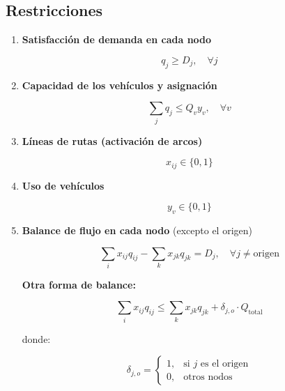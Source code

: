 \documentclass[11pt, a4paper]{article}
\begin{document}
\subsection{Restricciones}  
\begin{enumerate}[label=\roman*., leftmargin=*]  
    \item \textbf{Satisfacción de demanda en cada nodo}  
    
    \begin{equation}
    q_{j} \geq D_{j}, \quad \forall j  
    \end{equation}
    
    \item \textbf{Capacidad de los vehículos y asignación}  
    
    \begin{equation}
    \sum_{j} q_{j} \leq Q_{v} y_{v}, \quad \forall v  
    \end{equation}
    
    \item \textbf{Líneas de rutas (activación de arcos)}  
    
    \begin{equation}
    x_{ij} \in \{0,1\}  
    \end{equation}
    
    \item \textbf{Uso de vehículos}  
    
    \begin{equation}
    y_{v} \in \{0,1\}  
    \end{equation}
    
    \item \textbf{Balance de flujo en cada nodo} (excepto el origen)  
    
    \begin{equation}
    \sum_{i} x_{ij} q_{ij} - \sum_{k} x_{jk} q_{jk} = D_{j}, \quad \forall j \neq \text{origen}  
    \end{equation}
    
    \textbf{Otra forma de balance:}  
    
    \begin{equation}
    \sum_{i} x_{ij} q_{ij} \leq \sum_{k} x_{jk} q_{jk} + \delta_{j,o} \cdot Q_{\text{total}}  
    \end{equation}
    
    donde:  
    
    \begin{equation}
    \delta_{j,o} = \begin{cases}  
    1, & \text{si } j \text{ es el origen} \\
    0, & \text{otros nodos}  
    \end{cases}  
    \end{equation}
\end{enumerate}  
\end{document}
